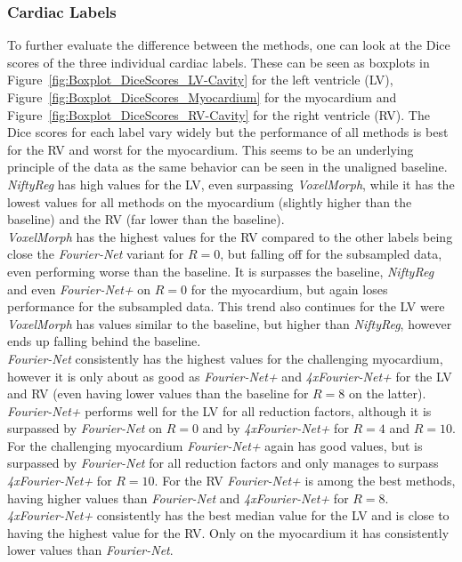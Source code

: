 \subsubsection{Cardiac Labels}
To further evaluate the difference between the methods, one can look at the Dice scores of the three individual cardiac labels. These can be seen as boxplots in Figure~\ref{fig:Boxplot_DiceScores_LV-Cavity} for the left ventricle (LV), Figure~\ref{fig:Boxplot_DiceScores_Myocardium} for the myocardium and Figure~\ref{fig:Boxplot_DiceScores_RV-Cavity} for the right ventricle (RV). The Dice scores for each label vary widely but the performance of all methods is best for the RV and worst for the myocardium. This seems to be an underlying principle of the data as the same behavior can be seen in the unaligned baseline. \\
\emph{NiftyReg} has high values for the LV, even surpassing \emph{VoxelMorph}, while it has the lowest values for all methods on the myocardium (slightly higher than the baseline) and the RV (far lower than the baseline). \\
\emph{VoxelMorph} has the highest values for the RV compared to the other labels being close the \emph{Fourier-Net} variant for $R=0$, but falling off for the subsampled data, even performing worse than the baseline. It is surpasses the baseline, \emph{NiftyReg} and even \emph{Fourier-Net+} on $R=0$ for the myocardium, but again loses performance for the subsampled data. This trend also continues for the LV were \emph{VoxelMorph} has values similar to the baseline, but higher than \emph{NiftyReg}, however ends up falling behind the baseline. \\
\emph{Fourier-Net} consistently has the highest values for the challenging myocardium, however it is only about as good as \emph{Fourier-Net+} and \emph{4xFourier-Net+} for the LV and RV (even having lower values than the baseline for $R=8$ on the latter). \\
\emph{Fourier-Net+} performs well for the LV for all reduction factors, although it is surpassed by \emph{Fourier-Net} on $R=0$ and by \emph{4xFourier-Net+} for $R=4$ and $R=10$. For the challenging myocardium \emph{Fourier-Net+} again has good values, but is surpassed by \emph{Fourier-Net} for all reduction factors and only manages to surpass \emph{4xFourier-Net+} for $R=10$. For the RV \emph{Fourier-Net+} is among the best methods, having higher values than \emph{Fourier-Net} and \emph{4xFourier-Net+} for $R=8$.\\
\emph{4xFourier-Net+} consistently has the best median value for the LV and is close to having the highest value for the RV. Only on the myocardium it has consistently lower values than \emph{Fourier-Net}.


